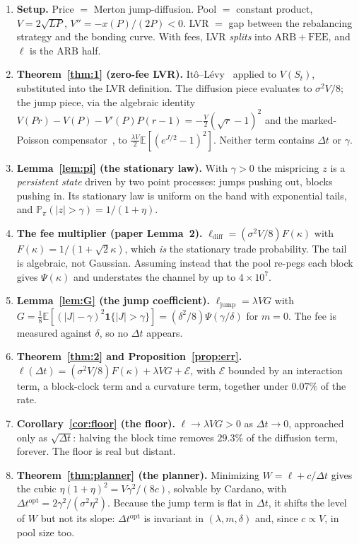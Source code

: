 \documentclass[11pt]{article}
\theoremstyle{definition}
\theoremstyle{remark}
\newcommand{\E}{\mathbb{E}}
\newcommand{\Prob}{\mathbb{P}}
\newcommand{\dt}{\Delta t}
\newcommand{\1}{\mathbf{1}}
\begin{document}
\begin{enumerate}[leftmargin=2em]
\item \textbf{Setup.} Price $=$ Merton jump-diffusion. Pool $=$ constant product, $V = 2\sqrt{LP}$, $V'' = -x(P)/(2P) < 0$. LVR $=$ gap between the rebalancing strategy and the bonding curve. With fees, LVR \emph{splits} into $\mathrm{ARB} + \mathrm{FEE}$, and $\ell$ is the $\mathrm{ARB}$ half.

\item \textbf{Theorem~\ref{thm:1} (zero-fee LVR).} It\^o--L\'evy~\cite[Prop.~8.14]{cont2003financial} applied to $V(S_t)$, substituted into the LVR definition. The diffusion piece evaluates to $\sigma^2V/8$; the jump piece, via the algebraic identity $V(Pr) - V(P) - V'(P)P(r-1) = -\tfrac{V}{2}(\sqrt r - 1)^2$ and the marked-Poisson compensator~\cite[Prop.~8.8]{cont2003financial}, to $\tfrac{\lambda V}{2}\E[(e^{J/2}-1)^2]$. Neither term contains $\dt$ or $\gamma$.

\item \textbf{Lemma~\ref{lem:pi} (the stationary law).} With $\gamma > 0$ the mispricing $z$ is a \emph{persistent state} driven by two point processes: jumps pushing out, blocks pushing in. Its stationary law is uniform on the band with exponential tails, and $\Prob_\pi(|z|>\gamma) = 1/(1+\eta)$.

\item \textbf{The fee multiplier (paper Lemma~2).} $\ell_{\mathrm{diff}} = (\sigma^2V/8)F(\kappa)$ with $F(\kappa) = 1/(1+\sqrt2\kappa)$, which \emph{is} the stationary trade probability. The tail is algebraic, not Gaussian. Assuming instead that the pool re-pegs each block gives $\Psi(\kappa)$ and understates the channel by up to $4\times10^7$.

\item \textbf{Lemma~\ref{lem:G} (the jump coefficient).} $\ell_{\mathrm{jump}} = \lambda VG$ with $G = \tfrac18\E[(|J|-\gamma)^2\1\{|J|>\gamma\}] = (\delta^2/8)\Psi(\gamma/\delta)$ for $m=0$. The fee is measured against $\delta$, so no $\dt$ appears.

\item \textbf{Theorem~\ref{thm:2} and Proposition~\ref{prop:err}.} $\ell(\dt) = (\sigma^2V/8)F(\kappa) + \lambda VG + \mathcal E$, with $\mathcal E$ bounded by an interaction term, a block-clock term and a curvature term, together under $0.07\%$ of the rate.

\item \textbf{Corollary~\ref{cor:floor} (the floor).} $\ell \to \lambda VG > 0$ as $\dt \to 0$, approached only as $\sqrt{\dt}$: halving the block time removes $29.3\%$ of the diffusion term, forever. The floor is real but distant.

\item \textbf{Theorem~\ref{thm:planner} (the planner).} Minimizing $W = \ell + c/\dt$ gives the cubic $\eta(1+\eta)^2 = V\gamma^2/(8c)$, solvable by Cardano, with $\dt^{\mathrm{opt}} = 2\gamma^2/(\sigma^2\eta^2)$. Because the jump term is flat in $\dt$, it shifts the level of $W$ but not its slope: $\dt^{\mathrm{opt}}$ is invariant in $(\lambda, m, \delta)$ and, since $c \propto V$, in pool size too.
\end{enumerate}
\end{document}
